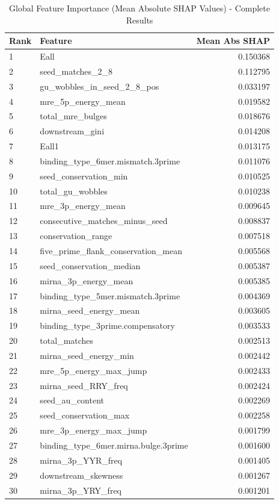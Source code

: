 \documentclass[en,ack]{dimscthesis}
\begin{document}
\begin{table}[H]
    \centering
    \caption{Global Feature Importance (Mean Absolute SHAP Values) - Complete Results}
    \label{tbl:feature_importance_complete}
    \footnotesize
    \begin{tabular}{llr}
        \toprule
        \textbf{Rank} & \textbf{Feature} & \textbf{Mean Abs SHAP} \\
        \midrule
        1 & Eall & 0.150368 \\
        2 & seed\_matches\_2\_8 & 0.112795 \\
        3 & gu\_wobbles\_in\_seed\_2\_8\_pos & 0.033197 \\
        4 & mre\_5p\_energy\_mean & 0.019582 \\
        5 & total\_mre\_bulges & 0.018676 \\
        6 & downstream\_gini & 0.014208 \\
        7 & Eall1 & 0.013175 \\
        8 & binding\_type\_6mer.mismatch.3prime & 0.011076 \\
        9 & seed\_conservation\_min & 0.010525 \\
        10 & total\_gu\_wobbles & 0.010238 \\
        11 & mre\_3p\_energy\_mean & 0.009645 \\
        12 & consecutive\_matches\_minus\_seed & 0.008837 \\
        13 & conservation\_range & 0.007518 \\
        14 & five\_prime\_flank\_conservation\_mean & 0.005568 \\
        15 & seed\_conservation\_median & 0.005387 \\
        16 & mirna\_3p\_energy\_mean & 0.005385 \\
        17 & binding\_type\_5mer.mismatch.3prime & 0.004369 \\
        18 & mirna\_seed\_energy\_mean & 0.003605 \\
        19 & binding\_type\_3prime.compensatory & 0.003533 \\
        20 & total\_matches & 0.002513 \\
        21 & mirna\_seed\_energy\_min & 0.002442 \\
        22 & mre\_5p\_energy\_max\_jump & 0.002433 \\
        23 & mirna\_seed\_RRY\_freq & 0.002424 \\
        24 & seed\_au\_content & 0.002269 \\
        25 & seed\_conservation\_max & 0.002258 \\
        26 & mre\_3p\_energy\_max\_jump & 0.001799 \\
        27 & binding\_type\_6mer.mirna.bulge.3prime & 0.001600 \\
        28 & mirna\_3p\_YYR\_freq & 0.001405 \\
        29 & downstream\_skewness & 0.001267 \\
        30 & mirna\_3p\_YRY\_freq & 0.001201 \\
        \bottomrule
    \end{tabular}
\end{table}
\end{document}
